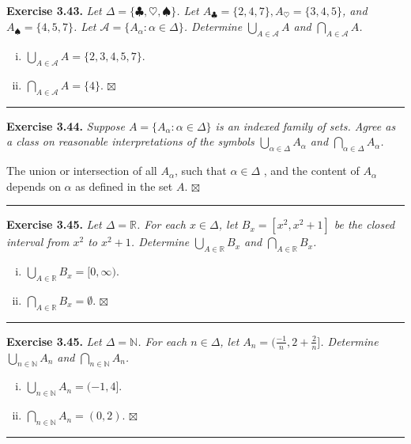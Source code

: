\documentclass[a4paper,12pt]{article}
\newcommand{\entry}[3]
{
   \noindent\textbf{#1.}
   \emph{#2}
   \bigskip

   \noindent#3
   \bigskip
   \hrule
   \vspace{24pt}
}
\newcommand{\biguni}[1]
{
\displaystyle\bigcup_{#1}
}
\newcommand{\bigint}[1]
{
\displaystyle\bigcap_{#1}
}
\newcommand{\reals}{\mathbb{R}}
\newcommand{\naturals}{\mathbb{N}}
\newcommand{\scripta}{\mathscr{A}}
\newcommand{\sig}{$\boxtimes$}
\begin{document}
\entry{Exercise 3.43}
{Let $\Delta = \{ \clubsuit, \heartsuit, \spadesuit \}$. Let $A_\clubsuit = \{ 2, 4, 7 \}, A_\heartsuit = \{ 3, 4, 5 \}$, and $A_\spadesuit = \{ 4, 5, 7 \}$. Let $\scripta = \{ A_\alpha : \alpha \in \Delta \}$. Determine $\biguni{A \in \scripta} A$ and $\bigint{A \in \scripta} A$.}
{
\begin{enumerate}[(i)]
\item
$\biguni{A \in \scripta} A = \{ 2, 3, 4, 5, 7 \}$.
\item
$\bigint{A \in \scripta} A = \{ 4 \}$. \sig
\end{enumerate}
}



\entry{Exercise 3.44}
{Suppose $A = \{ A_\alpha : \alpha \in \Delta \}$ is an indexed family of sets. Agree as a class on reasonable interpretations of the symbols $\biguni{\alpha \in \Delta} A_\alpha$ and $\bigint{\alpha \in \Delta} A_\alpha$.}
{The union or intersection of all $A_\alpha$, such that $\alpha \in \Delta$ , and the content of $A_\alpha$ depends on $\alpha$ as defined in the set $A$. \sig}



\entry{Exercise 3.45}
{Let $\Delta = \reals$. For each $x \in \Delta$, let $B_x = [x^2, x^2 + 1]$ be the closed interval from $x^2$ to $x^2 + 1$. Determine $\biguni{A \in \reals} B_x$ and $\bigint{A \in \reals} B_x$.}
{
\begin{enumerate}[(i)]
\item
$\biguni{A \in \reals} B_x = [0, \infty)$.
\item
$\bigint{A \in \reals} B_x = \emptyset$. \sig
\end{enumerate}
}



\entry{Exercise 3.45}
{Let $\Delta = \naturals$. For each $n \in \Delta$, let $A_n = (\frac{-1}{n}, 2 + \frac{2}{n}]$. Determine $\biguni{n \in \naturals} A_n$ and $\bigint{n \in \naturals} A_n$.}
{
\begin{enumerate}[(i)]
\item
$\biguni{n \in \naturals} A_n = (-1, 4]$.
\item
$\bigint{n \in \naturals} A_n = (0, 2)$. \sig
\end{enumerate}
}
\end{document}
